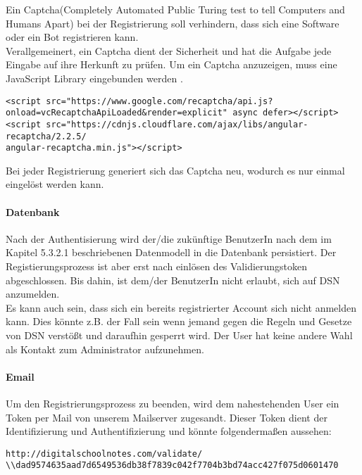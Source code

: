 Ein Captcha(Completely Automated Public Turing test to tell Computers and Humans Apart) bei der Registrierung soll verhindern, dass sich eine Software oder ein Bot registrieren kann.\\
Verallgemeinert, ein Captcha dient der Sicherheit und hat die Aufgabe jede Eingabe auf ihre Herkunft zu prüfen. Um ein Captcha anzuzeigen, muss eine JavaScript Library eingebunden werden \cite{CAPTCHA}.
\begin{lstlisting}[caption={Einbindung der JS-Library Recaptcha}]
<script src="https://www.google.com/recaptcha/api.js?
onload=vcRecaptchaApiLoaded&render=explicit" async defer></script>
<script src="https://cdnjs.cloudflare.com/ajax/libs/angular-recaptcha/2.2.5/
angular-recaptcha.min.js"></script>
\end{lstlisting}

Bei jeder Registrierung generiert sich das Captcha neu, wodurch es nur einmal eingelöst werden kann.\\


\paragraph{Datenbank}
Nach der Authentisierung wird der/die zukünftige BenutzerIn nach dem im Kapitel 5.3.2.1 beschriebenen Datenmodell in die Datenbank persistiert. Der Registierungsprozess ist aber erst nach einlösen des Validierungstoken abgeschlossen. Bis dahin, ist dem/der BenutzerIn nicht erlaubt, sich auf DSN anzumelden. \\

Es kann auch sein, dass sich ein bereits registrierter Account sich nicht anmelden kann. Dies könnte z.B. der Fall sein wenn jemand gegen die Regeln und Gesetze von DSN verstößt und daraufhin gesperrt wird. Der User hat keine andere Wahl als Kontakt zum Administrator aufzunehmen.

\paragraph{Email}
Um den Registrierungsprozess zu beenden, wird dem nahestehenden User ein Token per Mail von unserem Mailserver zugesandt. Dieser Token dient der Identifizierung und Authentifizierung und könnte folgendermaßen aussehen:
\begin{lstlisting}[caption={Validierungstoken für die Aktivierung des DSN-Accounts}]
http://digitalschoolnotes.com/validate/
\\dad9574635aad7d6549536db38f7839c042f7704b3bd74acc427f075d0601470
\end{lstlisting}

